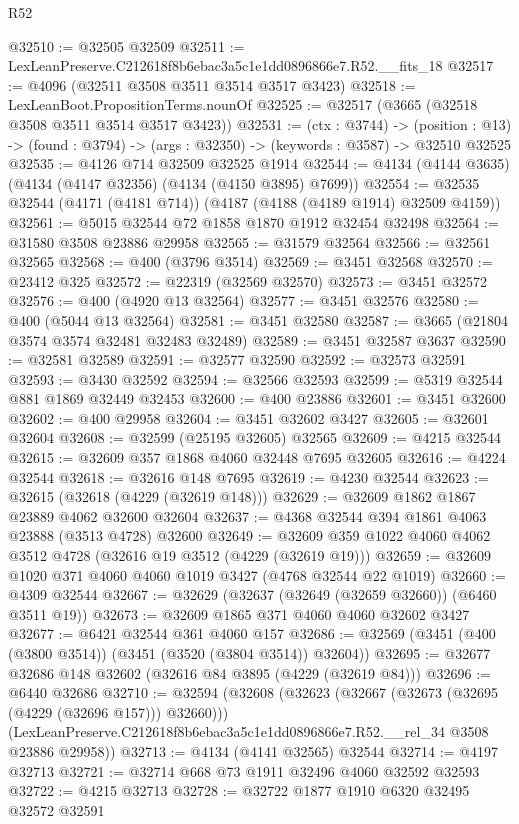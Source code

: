 \begin{lexlean}{R52}
\begin{coremodule}
@32510 := @32505 @32509
@32511 := LexLeanPreserve.C212618f8b6ebac3a5c1e1dd0896866e7.R52.__fits_18
@32517 := @4096 (@32511 @3508 @3511 @3514 @3517 @3423)
@32518 := LexLeanBoot.PropositionTerms.nounOf
@32525 := @32517 (@3665 (@32518 @3508 @3511 @3514 @3517 @3423))
@32531 := (ctx : @3744) ->
  (position : @13) -> (found : @3794) -> (args : @32350) -> (keywords : @3587) -> @32510 @32525
@32535 := @4126 @714 @32509 @32525 @1914
@32544 := @4134 (@4144 @3635) (@4134 (@4147 @32356) (@4134 (@4150 @3895) @7699))
@32554 := @32535 @32544 (@4171 (@4181 @714)) (@4187 (@4188 (@4189 @1914) @32509 @4159))
@32561 := @5015 @32544 @72 @1858 @1870 @1912 @32454 @32498
@32564 := @31580 @3508 @23886 @29958
@32565 := @31579 @32564
@32566 := @32561 @32565
@32568 := @400 (@3796 @3514)
@32569 := @3451 @32568
@32570 := @23412 @325
@32572 := @22319 (@32569 @32570)
@32573 := @3451 @32572
@32576 := @400 (@4920 @13 @32564)
@32577 := @3451 @32576
@32580 := @400 (@5044 @13 @32564)
@32581 := @3451 @32580
@32587 := @3665 (@21804 @3574 @3574 @32481 @32483 @32489)
@32589 := @3451 @32587 @3637
@32590 := @32581 @32589
@32591 := @32577 @32590
@32592 := @32573 @32591
@32593 := @3430 @32592
@32594 := @32566 @32593
@32599 := @5319 @32544 @881 @1869 @32449 @32453
@32600 := @400 @23886
@32601 := @3451 @32600
@32602 := @400 @29958
@32604 := @3451 @32602 @3427
@32605 := @32601 @32604
@32608 := @32599 (@25195 @32605) @32565
@32609 := @4215 @32544
@32615 := @32609 @357 @1868 @4060 @32448 @7695 @32605
@32616 := @4224 @32544
@32618 := @32616 @148 @7695
@32619 := @4230 @32544
@32623 := @32615 (@32618 (@4229 (@32619 @148)))
@32629 := @32609 @1862 @1867 @23889 @4062 @32600 @32604
@32637 := @4368 @32544 @394 @1861 @4063 @23888 (@3513 @4728) @32600
@32649 := @32609 @359 @1022 @4060 @4062 @3512 @4728 (@32616 @19 @3512 (@4229 (@32619 @19)))
@32659 := @32609 @1020 @371 @4060 @4060 @1019 @3427 (@4768 @32544 @22 @1019)
@32660 := @4309 @32544
@32667 := @32629 (@32637 (@32649 (@32659 @32660)) (@6460 @3511 @19))
@32673 := @32609 @1865 @371 @4060 @4060 @32602 @3427
@32677 := @6421 @32544 @361 @4060 @157
@32686 := @32569 (@3451 (@400 (@3800 @3514)) (@3451 (@3520 (@3804 @3514)) @32604))
@32695 := @32677 @32686 @148 @32602 (@32616 @84 @3895 (@4229 (@32619 @84)))
@32696 := @6440 @32686
@32710 := @32594
    (@32608
      (@32623 (@32667 (@32673 (@32695 (@4229 (@32696 @157))) @32660)))
      (LexLeanPreserve.C212618f8b6ebac3a5c1e1dd0896866e7.R52.__rel_34 @3508 @23886 @29958))
@32713 := @4134 (@4141 @32565) @32544
@32714 := @4197 @32713
@32721 := @32714 @668 @73 @1911 @32496 @4060 @32592 @32593
@32722 := @4215 @32713
@32728 := @32722 @1877 @1910 @6320 @32495 @32572 @32591

\end{coremodule}
\end{lexlean}
